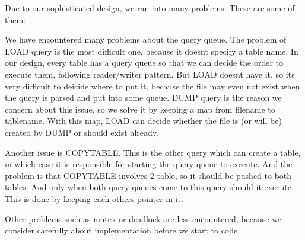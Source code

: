 Due to our sophisticated design, we ran into many problems. These are some of them\+:
\begin{DoxyItemize}
\item We have encountered many problems about the query queue. The problem of L\+O\+AD query is the most difficult one, because it doesn\textquotesingle{}t specify a table name. In our design, every table has a query queue so that we can decide the order to execute them, following reader/writer pattern. But L\+O\+AD doesn\textquotesingle{}t have it, so it\textquotesingle{}s very difficult to deicide where to put it, because the file may even not exist when the query is parsed and put into some queue. D\+U\+MP query is the reason we concern about this issue, so we solve it by keeping a map from filename to tablename. With this map, L\+O\+AD can decide whether the file is (or will be) created by D\+U\+MP or should exist already.
\item Another issue is C\+O\+P\+Y\+T\+A\+B\+LE. This is the other query which can create a table, in which case it is responsible for starting the query queue to execute. And the problem is that C\+O\+P\+Y\+T\+A\+B\+LE involves 2 table, so it should be pushed to both tables. And only when both query queues come to this query should it execute. This is done by keeping each other\textquotesingle{}s pointer in it.
\item Other problems such as mutex or deadlock are less encountered, because we consider carefully about implementation before we start to code. 
\end{DoxyItemize}